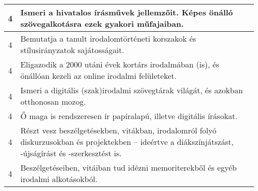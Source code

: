\begin{longtable}{c | p{12cm} }
                                
                                          4 &  Ismeri a hivatalos írásművek jellemzőit. Képes önálló szövegalkotásra ezek gyakori műfajaiban. \\ \hline
                                          4 &  Bemutatja a tanult irodalomtörténeti korszakok és stílusirányzatok sajátosságait. \\ \hline
                                          4 &  Eligazodik a 2000 utáni évek kortárs irodalmában (is), és önállóan kezeli az online irodalmi felületeket. \\ \hline
                                          4 &  Ismeri a digitális (szak)irodalmi szövegtárak világát, és azokban otthonosan mozog. \\ \hline
                                          4 &  Ő maga is rendszeresen ír papíralapú, illetve digitális írásokat. \\ \hline
                                          4 &  Részt vesz beszélgetésekben, vitákban, irodalomról folyó diskurzusokban és projektekben – ideértve a diákszínjátszást, -újságírást és -szerkesztést is. \\ \hline
                                          4 &  Beszélgetéseiben, vitáiban tud idézni memoriterekből és egyéb irodalmi alkotásokból. \\ \hline
                                      
                        \end{longtable}
            \clearpage

